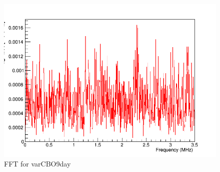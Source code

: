 \begin{figure}[ht]
\centering 
\includegraphics[scale=0.5]{Figures/varCBO9day_fft.png}
\decoRule
\caption{FFT for varCBO9day}
\label{fig:varCBO9day_fft}
\end{figure}


